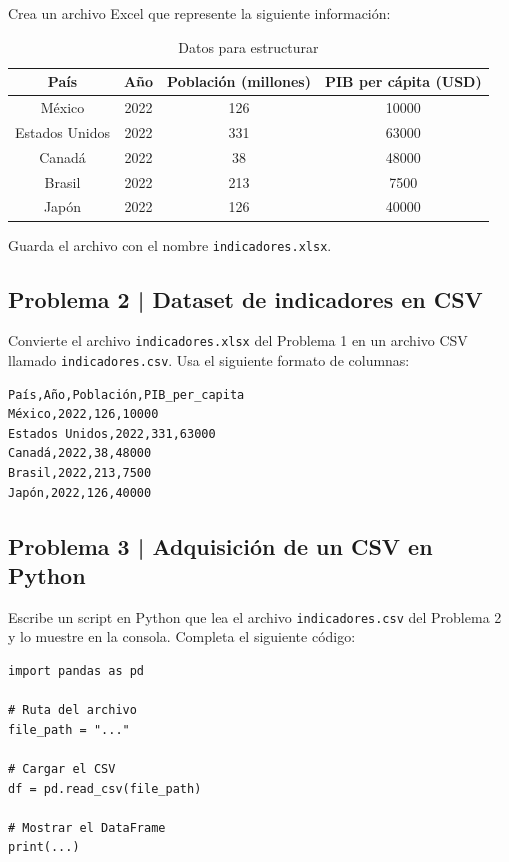 \documentclass{article}
\begin{document}
Crea un archivo Excel que represente la siguiente información:

\begin{table}[h]
    \centering
    \begin{tabular}{|c|c|c|c|}
        \hline
        País & Año & Población (millones) & PIB per cápita (USD) \\
        \hline
        México & 2022 & 126 & 10000 \\
        Estados Unidos & 2022 & 331 & 63000 \\
        Canadá & 2022 & 38 & 48000 \\
        Brasil & 2022 & 213 & 7500 \\
        Japón & 2022 & 126 & 40000 \\
        \hline
    \end{tabular}
    \caption{Datos para estructurar}
\end{table}

Guarda el archivo con el nombre \texttt{indicadores.xlsx}.

\clearpage

\subsection*{Problema 2 | Dataset de indicadores en CSV}

Convierte el archivo \texttt{indicadores.xlsx} del Problema 1 en un archivo CSV llamado \texttt{indicadores.csv}. Usa el siguiente formato de columnas:

\begin{verbatim}
País,Año,Población,PIB_per_capita
México,2022,126,10000
Estados Unidos,2022,331,63000
Canadá,2022,38,48000
Brasil,2022,213,7500
Japón,2022,126,40000
\end{verbatim}

\clearpage

\subsection*{Problema 3 | Adquisición de un CSV en Python}

Escribe un script en Python que lea el archivo \texttt{indicadores.csv} del Problema 2 y lo muestre en la consola. Completa el siguiente código:

\begin{lstlisting}[style=python]
import pandas as pd

# Ruta del archivo
file_path = "..."

# Cargar el CSV
df = pd.read_csv(file_path)

# Mostrar el DataFrame
print(...)
\end{lstlisting}
\end{document}
